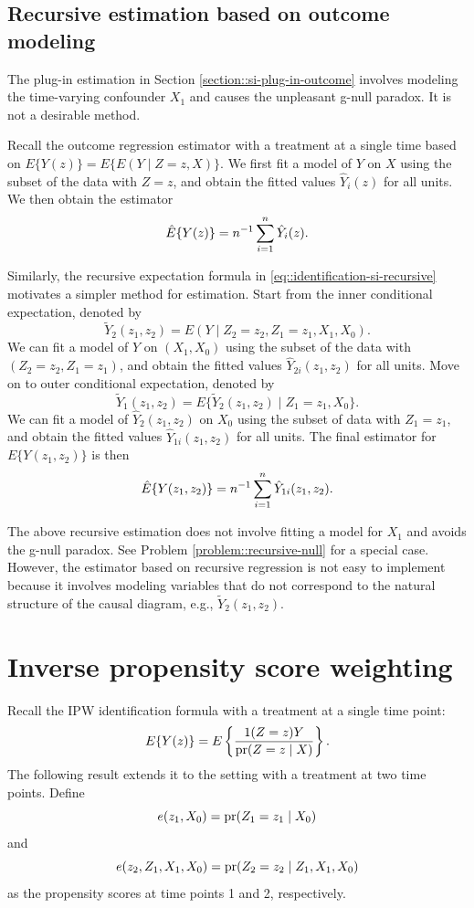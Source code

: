  

\subsection{Recursive estimation based on outcome modeling}
\label{section::recursive}

The plug-in estimation in Section \ref{section::si-plug-in-outcome} involves modeling the time-varying confounder $X_1$ and causes the unpleasant g-null paradox. It is not a desirable method. 

Recall the outcome regression estimator with a treatment at a single time based on $E\{  Y(z)  \} = E\{  E(Y\mid Z=z, X) \}$. We first fit a model of $Y$ on $X$ using the subset of the data with $Z=z$, and obtain the fitted values $\hat{Y}_i(z)$ for all units. We then obtain the estimator 
$$
\hat E\{  Y(z)  \}  = n^{-1} \sum_{i=1}^n \hat{Y}_i(z).
$$

Similarly, the recursive expectation formula in \eqref{eq::identification-si-recursive} motivates a  simpler method for estimation. Start from the inner conditional expectation, denoted by 
$$
\tilde Y_2(z_1, z_2) = E(Y\mid Z_2 = z_2,Z_1 = z_1, X_1,  X_0).
$$ 
We can fit a model of $Y$ on $(X_1,X_0)$ using the subset of the data with $(Z_2 = z_2, Z_1 = z_1)$, and obtain the fitted values $\hat{Y}_{2i}(z_1, z_2) $ for all units. Move on to outer conditional expectation, denoted by 
$$
\tilde{Y}_1(z_1, z_2)  =  E\{  \tilde{Y}_2(z_1, z_2)  \mid Z_1=z_1, X_0 \}. 
$$
We can fit a model of $\hat{Y}_2(z_1, z_2) $ on $X_0$ using the subset of data with $Z_1=z_1$, and obtain the fitted values $\hat{Y}_{1i}(z_1, z_2) $ for all units. The final estimator for $E\{ Y(z_1, z_2) \} $ is then
$$
\hat E\{ Y(z_1, z_2) \}  = n^{-1} \sum_{i=1}^n \hat{Y}_{1i}(z_1, z_2) .
$$

The above recursive estimation does not involve fitting a model for $X_1$ and avoids the g-null paradox. See Problem \ref{problem::recursive-null} for a special case. However, the estimator based on recursive regression is not easy to implement because it involves modeling variables that do not correspond to the natural structure of the causal diagram, e.g., $\tilde{Y}_2(z_1, z_2)$. 




\section{Inverse propensity score weighting}\label{section::si-ipw}


Recall the IPW identification formula with a treatment at a single time point:
$$
E\{  Y(z) \} = E  \left\{   \frac{ 1(Z=z) Y  }{  \textup{pr}(Z=z\mid X) }  \right\}.
$$
The following result extends it to the setting with a treatment at two time points. Define 
$$
e(z_1, X_0) = \textup{pr}(Z_1=z_1\mid X_0) 
$$
and
$$
e(z_2, Z_1, X_1, X_0) =  \textup{pr}(Z_2 = z_2 \mid Z_1, X_1,  X_0)
$$
as the propensity scores at time points 1 and 2, respectively. 


